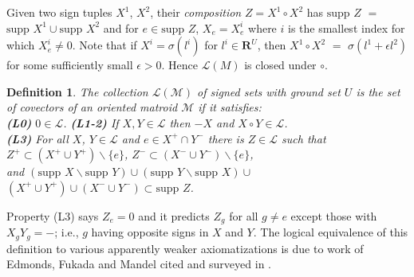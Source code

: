 \documentclass{article}
\def\Reals{\ensuremath{\mathbf R}}
\newtheorem{definition}{Definition}
\newcommand{\supp}[1]{{{\mbox{supp\ }#1}}}
\newcommand{\sminus}{\backslash}
\begin{document}
Given two sign tuples $X^1$, $X^2$, their \textit{composition}
$Z=X^1 \circ X^2$ has $\supp{Z}$ $=$ 
$\supp{X^1}\cup \supp{X^2}$
and 
for $e\in\supp{Z}$,
$X_e=X^i_e$ where $i$ is the smallest index for which $X^i_e\neq 0$.
Note that if $X^i=\sigma(l^i)$ for $l^i\in\Reals^U$, then $X^1\circ X^2$
$=$ $\sigma(l^1 + \epsilon l^2)$ for some sufficiently small $\epsilon >0$.
Hence $\mathcal{L}(M)$ is closed under 
$\circ$.

\begin{definition}
\label{OMDEF}
The collection $\mathcal{L}(\mathcal{M})$ 
of signed sets with ground set $U$ is the set of 
\textit{covectors} of an oriented matroid 
$\mathcal{M}$ if it satisfies:\\
\textbf{(L0)} $0\in\mathcal{L}$. \textbf{(L1-2)} If $X,Y\in
      \mathcal{L}$ then $-X$ and $X\circ Y\in\mathcal{L}$.\\
\textbf{(L3)} For all $X$, $Y \in \mathcal{L}$ and $e\in X^+\cap Y^-$
there is
$Z\in\mathcal{L}$ such that 
$Z^+\subset(X^+\cup Y^+)\sminus\{e\}$,
$Z^-\subset(X^-\cup Y^-)\sminus\{e\}$,\\
and 
$(\supp{X}\sminus \supp{Y})\cup(\supp{Y}\sminus \supp{X})\cup$\\
\hspace*{0.5in}$(X^+\cup Y^+)\cup(X^-\cup Y^-)\subset\supp{Z}$.
\end{definition}
Property (L3) says $Z_e=0$ and it predicts $Z_g$ for all
$g\neq e$ except those with $X_gY_g = -$; i.e., $g$
having opposite signs in
$X$ and $Y$.  The logical
equivalence of this definition to various apparently weaker
axiomatizations is due to work of Edmonds, Fukada and 
Mandel cited and surveyed in \cite{OMBOOK}.
\end{document}
